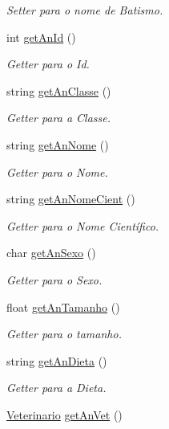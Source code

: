 \begin{DoxyCompactItemize}
\begin{DoxyCompactList}\small\item\em Setter para o nome de Batismo. \end{DoxyCompactList}\item 
int \hyperlink{classAnimal_a6ecedda7678495e0a7ad7518f81df97a}{get\+An\+Id} ()
\begin{DoxyCompactList}\small\item\em Getter para o Id. \end{DoxyCompactList}\item 
string \hyperlink{classAnimal_af5fcc32101cf561359e98d2fa639e6c8}{get\+An\+Classe} ()
\begin{DoxyCompactList}\small\item\em Getter para a Classe. \end{DoxyCompactList}\item 
string \hyperlink{classAnimal_a5f5d18cb8cb210bc040a1824f2c563b7}{get\+An\+Nome} ()
\begin{DoxyCompactList}\small\item\em Getter para o Nome. \end{DoxyCompactList}\item 
string \hyperlink{classAnimal_ad85e22e58b1eb1a1e1dfa82565eb0b07}{get\+An\+Nome\+Cient} ()
\begin{DoxyCompactList}\small\item\em Getter para o Nome Científico. \end{DoxyCompactList}\item 
char \hyperlink{classAnimal_abf665342c066528a05c06141c308dcf0}{get\+An\+Sexo} ()
\begin{DoxyCompactList}\small\item\em Getter para o Sexo. \end{DoxyCompactList}\item 
float \hyperlink{classAnimal_ac41f9d4acfdb320b0a9f03c7fb439852}{get\+An\+Tamanho} ()
\begin{DoxyCompactList}\small\item\em Getter para o tamanho. \end{DoxyCompactList}\item 
string \hyperlink{classAnimal_a8ebc0bf27012a5cbf394c8f1b99f785a}{get\+An\+Dieta} ()
\begin{DoxyCompactList}\small\item\em Getter para a Dieta. \end{DoxyCompactList}\item 
\hyperlink{classVeterinario}{Veterinario} \hyperlink{classAnimal_a8bf6c4f4fcb8adf1904ca85dd09c5da1}{get\+An\+Vet} ()

\end{DoxyCompactItemize}
